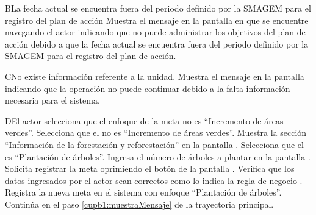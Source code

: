    \begin{UCtrayectoriaA}{B}{La fecha actual se encuentra fuera del periodo definido por la SMAGEM para el registro del plan de acción}
    \UCpaso[\UCsist] Muestra el mensaje  en la pantalla en que se encuentre navegando el actor indicando que no puede administrar los objetivos del plan de acción debido a que la fecha actual se encuentra fuera del periodo definido por la SMAGEM para el registro del plan de acción.
 \end{UCtrayectoriaA}

 
\begin{UCtrayectoriaA}{C}{No existe información referente a la unidad.}
	\UCpaso[\UCsist] Muestra el mensaje  en la pantalla  indicando que la operación no puede continuar debido a la falta información necesaria para el sistema.
\end{UCtrayectoriaA}

\begin{UCtrayectoriaA}{D}{El actor selecciona que el enfoque de la meta no es ``Incremento de áreas verdes''.}
	\UCpaso[\UCactor] Selecciona que el  no es ``Incremento de áreas verdes''. 
	\UCpaso[\UCsist] Muestra la sección ``Información de la forestación y reforestación'' en la pantalla .
	\UCpaso[\UCactor] Selecciona que el  es ``Plantación de árboles''. 
	\UCpaso[\UCactor] Ingresa el número de árboles a plantar en la pantalla .
	\UCpaso[\UCactor] Solicita registrar la meta oprimiendo el botón  de la pantalla .  
	\UCpaso[\UCsist] Verifica que los datos ingresados por el actor sean correctos como lo indica la regla de negocio .   
	\UCpaso[\UCsist] Registra la nueva meta en el sistema con enfoque ``Plantación de árboles''.
	\UCpaso[] Continúa en el paso \ref{cupb1:muestraMensaje} de la trayectoria principal.
\end{UCtrayectoriaA}

